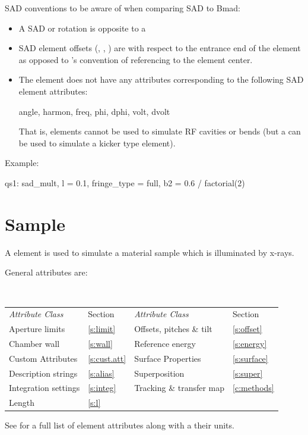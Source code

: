 {SAD conventions to be aware of when comparing SAD to Bmad:
\begin{itemize}
\item
A SAD  or  rotation is opposite to a \bmad {}
\item
SAD element offsets (, , ) are with respect to the entrance end of the element
as opposed to \bmad's convention of referencing to the element center.
\item
  The \bmad {} element does not have any attributes corresponding to the following
SAD  element attributes:
\vspace{1.0ex}
\begin{example}
  angle, harmon, freq, phi, dphi, volt, dvolt
\end{example}
\vspace{1.0ex}
That is,  elements cannot be used to simulate RF cavities or bends (but a 
can be used to simulate a kicker type element).
\end{itemize}

Example:
\begin{example}
  qs1: sad_mult, l = 0.1, fringe_type = full, b2 = 0.6 / factorial(2)
\end{example}

\newpage

\section{Sample}
\label{s:sample}

A  element is used to simulate a material sample which is illuminated by x-rays.

General  attributes are:
\begin{center}
\tt
\begin{tabular}{llll} \toprule
  {\sl Attribute Class}      & Section           & {\sl Attribute Class}      & Section         \\
  Aperture limits            & \ref{s:limit}     & Offsets, pitches \& tilt   & \ref{s:offset}  \\ \midrule
  Chamber wall               & \ref{s:wall}      & Reference energy           & \ref{s:energy}  \\ 
  Custom Attributes          & \ref{s:cust.att}  & Surface Properties         & \ref{s:surface} \\
  Description strings        & \ref{s:alias}     & Superposition              & \ref{s:super}   \\
  Integration settings       & \ref{s:integ}     & Tracking \& transfer map   & \ref{c:methods} \\
  Length                     & \ref{s:l}         &                            &                 \\
  \bottomrule
\end{tabular}
\end{center}
\toffset
See  for a full list of element attributes along with a their units.

}
